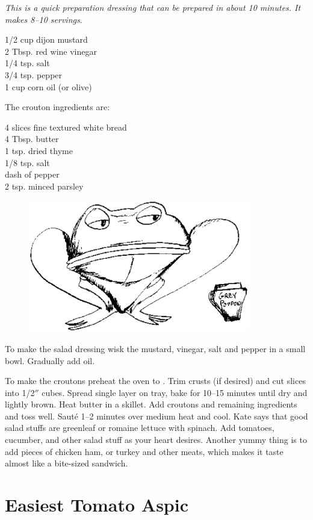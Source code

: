 \textit{This is a quick preparation dressing 
that can be prepared in about 10 minutes.  It makes 8--10 servings}.
\begin{ingredients}
1/2 cup dijon mustard \\
2 Tbsp.  red wine vinegar \\
1/4 tsp. salt \\
3/4 tsp. pepper \\
1 cup corn oil (or olive)
\end{ingredients}
The crouton ingredients are:
\begin{ingredients}
4 slices fine textured white bread \\
4 Tbsp.  butter \\
1 tsp. dried thyme \\
1/8 tsp. salt \\
dash of pepper \\
2 tsp. minced parsley
\end{ingredients}
\begin{figure}
\centerline{\includegraphics[width=3.8in,clip]{frog.ps}}
\end{figure}
To make the salad dressing wisk the mustard, vinegar, salt and pepper in a small
bowl.  Gradually add oil.

To make the croutons preheat the oven to .  Trim crusts (if desired)
and cut slices into 1/2$''$ cubes.  Spread single layer on tray, bake for 10--15
minutes until dry and lightly brown.  Heat butter in a skillet.  Add croutons and
remaining ingredients and toss well.  Saut\'{e} 1--2 minutes over medium heat and
cool.  Kate says that good salad stuffs are greenleaf or romaine lettuce with
spinach.  Add tomatoes, cucumber, and other salad stuff as your heart desires. 
Another yummy thing is to add pieces of chicken ham, or 
turkey and other meats, which makes it taste almost like a bite-sized sandwich.

\section{Easiest Tomato Aspic}

